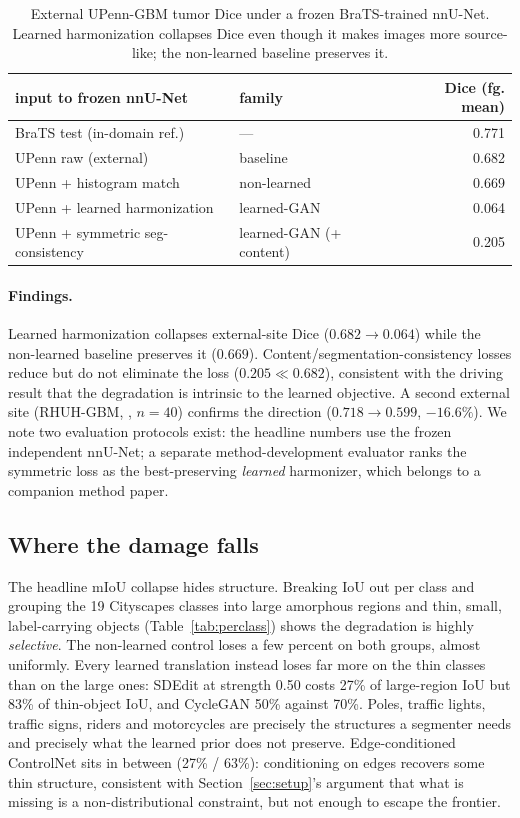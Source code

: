 \begin{table}[t]
\centering
\caption{External UPenn-GBM tumor Dice under a frozen BraTS-trained nnU-Net.
Learned harmonization collapses Dice even though it makes images more source-like;
the non-learned baseline preserves it.}
\label{tab:medical}
\begin{tabular}{llr}
\toprule
input to frozen nnU-Net & family & Dice (fg. mean) \\
\midrule
BraTS test (in-domain ref.) & --- & 0.771 \\
UPenn raw (external) & baseline & 0.682 \\
UPenn + histogram match & non-learned & 0.669 \\
UPenn + learned harmonization & learned-GAN & 0.064 \\
UPenn + symmetric seg-consistency & learned-GAN (+ content) & 0.205 \\
\bottomrule
\end{tabular}
\end{table}

\paragraph{Findings.} Learned harmonization collapses external-site Dice
($0.682{\rightarrow}0.064$) while the non-learned baseline preserves it ($0.669$).
Content/segmentation-consistency losses reduce but do not eliminate the loss
($0.205 \ll 0.682$), consistent with the driving result that the degradation is
intrinsic to the learned objective. A second external site (RHUH-GBM,
\citealp{cardoso2022rhuh}, $n{=}40$) confirms the direction
($0.718{\rightarrow}0.599$, $-16.6\%$). We note two evaluation protocols exist: the
headline numbers use the frozen independent nnU-Net; a separate
method-development evaluator ranks the symmetric loss as the best-preserving
\emph{learned} harmonizer, which belongs to a companion method paper.


\subsection{Where the damage falls}
\label{sec:perclass}
The headline mIoU collapse hides structure. Breaking IoU out per class and grouping the 19
Cityscapes classes into large amorphous regions and thin, small, label-carrying objects
(Table~\ref{tab:perclass}) shows the degradation is highly \emph{selective}. The non-learned
control loses a few percent on both groups, almost uniformly. Every learned translation instead
loses far more on the thin classes than on the large ones: SDEdit at strength 0.50 costs 27\% of
large-region IoU but 83\% of thin-object IoU, and CycleGAN 50\% against 70\%. Poles, traffic
lights, traffic signs, riders and motorcycles are precisely the structures a segmenter needs and
precisely what the learned prior does not preserve. Edge-conditioned ControlNet sits in between
(27\% / 63\%): conditioning on edges recovers some thin structure, consistent with
Section~\ref{sec:setup}'s argument that what is missing is a non-distributional constraint, but
not enough to escape the frontier.

